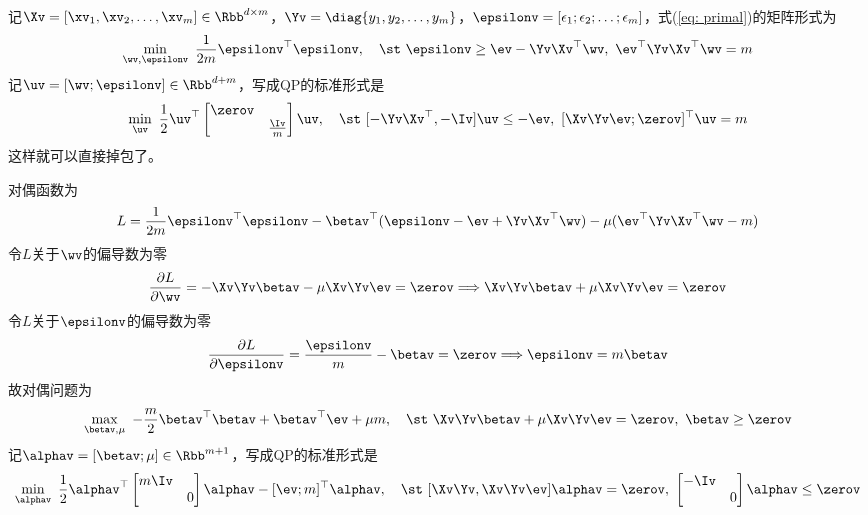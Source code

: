 \documentclass{ctexart}
\begin{document}
记$\Xv = [\xv_1, \xv_2, \ldots, \xv_m] \in \Rbb^{d \times m}$，$\Yv = \diag \{ y_1, y_2, \ldots, y_m\}$，$\epsilonv = [\epsilon_1; \epsilon_2; \ldots; \epsilon_m]$，式(\ref{eq: primal})的矩阵形式为
\begin{align*}
    \min_{\wv, \epsilonv} ~ \frac{1}{2m} \epsilonv^\top \epsilonv, \quad \st ~ \epsilonv \ge \ev - \Yv \Xv^\top \wv, ~ \ev^\top \Yv \Xv^\top \wv = m
\end{align*}
记$\uv = [\wv; \epsilonv] \in \Rbb^{d+m}$，写成QP的标准形式是
\begin{align*}
    \min_{\uv} ~ \frac{1}{2} \uv^\top \begin{bmatrix}
        \zerov \\ & \frac{\Iv}{m}
    \end{bmatrix} \uv, \quad \st ~ [- \Yv \Xv^\top, -\Iv] \uv \le -\ev, ~ [\Xv \Yv \ev; \zerov]^\top \uv = m
\end{align*}
这样就可以直接掉包了。

对偶函数为
\begin{align*}
    L = \frac{1}{2m} \epsilonv^\top \epsilonv - \betav^\top (\epsilonv - \ev + \Yv \Xv^\top \wv) - \mu (\ev^\top \Yv \Xv^\top \wv - m)
\end{align*}
令$L$关于$\wv$的偏导数为零
\begin{align*}
    \frac{\partial L}{\partial \wv} = - \Xv \Yv \betav - \mu \Xv \Yv \ev = \zerov \Longrightarrow \Xv \Yv \betav + \mu \Xv \Yv \ev = \zerov
\end{align*}
令$L$关于$\epsilonv$的偏导数为零
\begin{align*}
    \frac{\partial L}{\partial \epsilonv} = \frac{\epsilonv}{m} - \betav = \zerov \Longrightarrow \epsilonv = m \betav
\end{align*}
故对偶问题为
\begin{align*}
    \max_{\betav, \mu} ~ - \frac{m}{2} \betav^\top \betav + \betav^\top \ev + \mu m, \quad \st ~ \Xv \Yv \betav + \mu \Xv \Yv \ev = \zerov, ~ \betav \ge \zerov
\end{align*}
记$\alphav = [\betav; \mu] \in \Rbb^{m+1}$，写成QP的标准形式是
\begin{align*}
    \min_{\alphav} ~ \frac{1}{2} \alphav^\top \begin{bmatrix}
        m \Iv \\ & 0
    \end{bmatrix} \alphav - [\ev; m]^\top \alphav, \quad \st ~ [\Xv \Yv, \Xv \Yv \ev] \alphav = \zerov, ~ \begin{bmatrix}
        - \Iv \\ & 0
    \end{bmatrix} \alphav \le \zerov
\end{align*}
\end{document}
